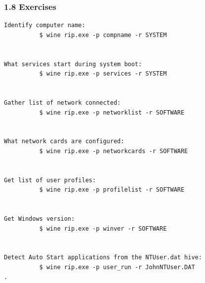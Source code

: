 \begin{frame}[fragile]
  \frametitle{1.8 Exercises}
  \begin{lstlisting}[basicstyle=\tiny]
Identify computer name:
          $ wine rip.exe -p compname -r SYSTEM


What services start during system boot:
          $ wine rip.exe -p services -r SYSTEM


Gather list of network connected:
          $ wine rip.exe -p networklist -r SOFTWARE


What network cards are configured:
          $ wine rip.exe -p networkcards -r SOFTWARE


Get list of user profiles:
          $ wine rip.exe -p profilelist -r SOFTWARE


Get Windows version:
          $ wine rip.exe -p winver -r SOFTWARE


Detect Auto Start applications from the NTUser.dat hive:
          $ wine rip.exe -p user_run -r JohnNTUser.DAT
.
  \end{lstlisting}
\end{frame}





